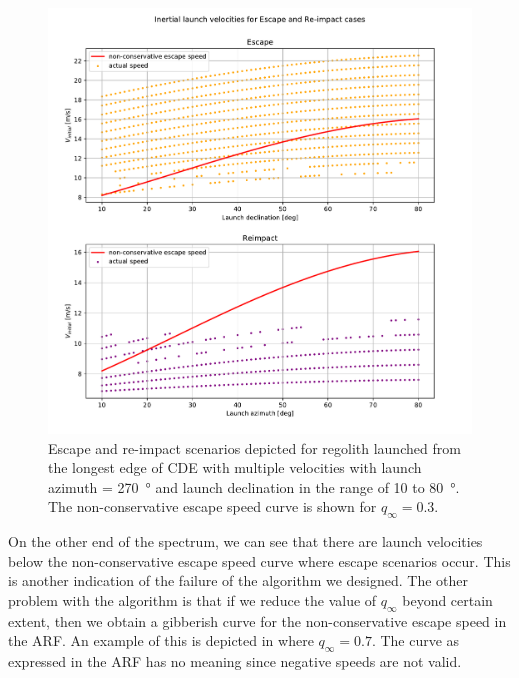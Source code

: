 \begin{figure}[htb]
\centering
\captionsetup{justification=centering}
\includegraphics[width=\textwidth, height=0.7\textheight, keepaspectratio=true]{non_conservative_escape_speed/qinfinity_dot3_escape_reimpact_multipleVelocities.pdf}
\caption{Escape and re-impact scenarios depicted for regolith launched from the longest edge of \gls{CDE} with multiple velocities with launch azimuth = \SI{270}{\degree} and launch declination in the range of 10 to \SI{80}{\degree}. The non-conservative escape speed curve is shown for $q_\infty = 0.3$.}
\label{fig:non_conservative_multiple_velocities_qinfinity_0.3}
\end{figure}
\FloatBarrier
On the other end of the spectrum, we can see that there are launch velocities below the non-conservative escape speed curve where escape scenarios occur. This is another indication of the failure of the algorithm we designed.
%
\newline\newline
%
The other problem with the algorithm is that if we reduce the value of $q_\infty$ beyond certain extent, then we obtain a gibberish curve for the non-conservative escape speed in the \gls{ARF}. An example of this is depicted in  where $q_\infty = 0.7$. The curve as expressed in the \gls{ARF} has no meaning since negative speeds are not valid.
